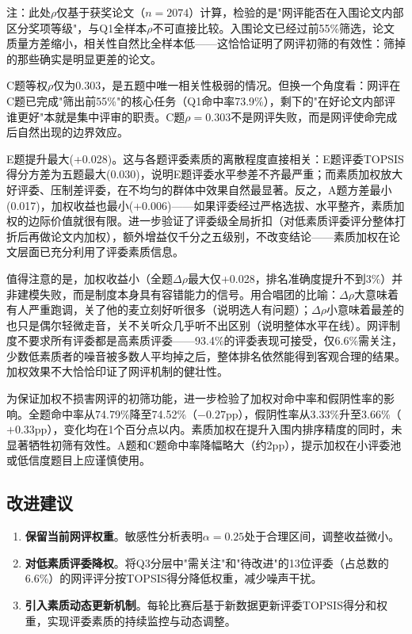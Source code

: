 \documentclass[UTF8,12pt]{ctexart}
\begin{document}
注：此处$\rho$仅基于获奖论文（$n=2074$）计算，检验的是"网评能否在入围论文内部区分奖项等级"，与Q1全样本$\rho$不可直接比较。入围论文已经过前55\%筛选，论文质量方差缩小，相关性自然比全样本低——这恰恰证明了网评初筛的有效性：筛掉的那些确实是明显更差的论文。

C题等权$\rho$仅为0.303，是五题中唯一相关性极弱的情况。但换一个角度看：网评在C题已完成"筛出前55\%"的核心任务（Q1命中率73.9\%），剩下的"在好论文内部评谁更好"本就是集中评审的职责。C题$\rho=0.303$不是网评失败，而是网评使命完成后自然出现的边界效应。

E题提升最大(+0.028)。这与各题评委素质的离散程度直接相关：E题评委TOPSIS得分方差为五题最大(0.030)，说明E题评委水平参差不齐最严重；而素质加权放大好评委、压制差评委，在不均匀的群体中效果自然最显著。反之，A题方差最小(0.017)，加权收益也最小(+0.006)——如果评委经过严格选拔、水平整齐，素质加权的边际价值就很有限。进一步验证了评委级全局折扣（对低素质评委评分整体打折后再做论文内加权），额外增益仅千分之五级别，不改变结论——素质加权在论文层面已充分利用了评委素质信息。

值得注意的是，加权收益小（全题$\Delta\rho$最大仅+0.028，排名准确度提升不到3\%）并非建模失败，而是制度本身具有容错能力的信号。用合唱团的比喻：$\Delta\rho$大意味着有人严重跑调，关了他的麦立刻好听很多（说明选人有问题）；$\Delta\rho$小意味着最差的也只是偶尔轻微走音，关不关听众几乎听不出区别（说明整体水平在线）。网评制度不要求所有评委都是高素质评委——93.4\%的评委表现可接受，仅6.6\%需关注，少数低素质者的噪音被多数人平均掉之后，整体排名依然能得到客观合理的结果。加权效果不大恰恰印证了网评机制的健壮性。

为保证加权不损害网评的初筛功能，进一步检验了加权对命中率和假阴性率的影响。全题命中率从74.79\%降至74.52\%（$-0.27$pp），假阴性率从3.33\%升至3.66\%（$+0.33$pp），变化均在1个百分点以内。素质加权在提升入围内排序精度的同时，未显著牺牲初筛有效性。A题和C题命中率降幅略大（约2pp），提示加权在小评委池或低信度题目上应谨慎使用。

\subsection{改进建议}

\begin{enumerate}
    \item \textbf{保留当前网评权重}。敏感性分析表明$\alpha=0.25$处于合理区间，调整收益微小。
    \item \textbf{对低素质评委降权}。将Q3分层中"需关注"和"待改进"的13位评委（占总数的6.6\%）的网评评分按TOPSIS得分降低权重，减少噪声干扰。
    \item \textbf{引入素质动态更新机制}。每轮比赛后基于新数据更新评委TOPSIS得分和权重，实现评委素质的持续监控与动态调整。
\end{enumerate}
\end{document}

